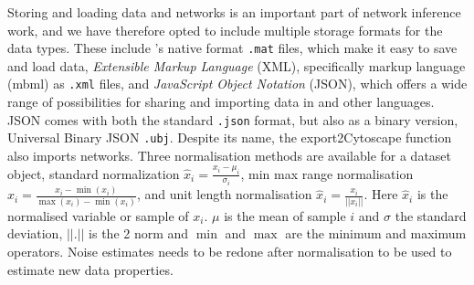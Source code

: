 \begin{bibunit}
Storing and loading data and networks is an important part of network inference work, and we have therefore opted to include multiple storage formats for the data types.
These include \matlab's native format \texttt{.mat} files, which make it easy to save and load data, \emph{Extensible Markup Language}
(XML), specifically \matlab markup language (mbml) \citep{Almeida2003} as \texttt{.xml} files, and \emph{JavaScript Object Notation} (JSON), which offers a wide range of possibilities for sharing and importing data in \matlab and other languages.
JSON comes with both the standard \texttt{.json} format, but also as a binary version, Universal Binary JSON \texttt{.ubj}.
Despite its name, the export2Cytoscape function also imports networks.%
Three normalisation methods are available for a dataset object,
standard normalization \(\hat{x}_{i} = \frac{x_{i}-\mu_{i}}{\sigma_{i}}\), min max range normalisation \(\hat{x}_{i} = \frac{x_{i} - \min(x_{i})}{\max(x_{i}) - \min(x_{i})}\), and unit length normalisation \(\hat{x}_{i} = \frac{x_{i}}{||x_{i}||}\). Here \(\hat{x}_{i}\) is the normalised variable or sample of \(x_{i}\). \(\mu\) is the mean of sample \(i\) and \(\sigma\) the standard deviation, \(||.||\) is the 2 norm and \(\min\) and \(\max\) are the minimum and maximum operators.
Noise estimates needs to be redone after normalisation to be used to estimate new data properties.%



\end{bibunit}
